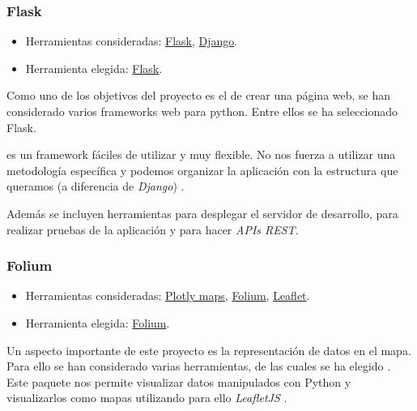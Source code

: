 \subsubsection{Flask}

\begin{itemize}
	\tightlist
	\item
	Herramientas consideradas:
	\href{http://flask.pocoo.org/}{Flask}, 
	\href{https://www.djangoproject.com/}{Django}.
	\item
	Herramienta elegida:
	\href{http://flask.pocoo.org/}{Flask}.
\end{itemize}

Como uno de los objetivos del proyecto es el de crear una página web, se han considerado varios frameworks web para python. Entre ellos se ha seleccionado Flask.

 es un framework fáciles de utilizar y muy flexible. No nos fuerza a utilizar una metodología específica y podemos organizar la aplicación con la estructura que queramos (a diferencia de \textit{Django}) \cite{book:flask}.

Además se incluyen herramientas para desplegar el servidor de desarrollo, para realizar pruebas de la aplicación y para hacer \textit{APIs REST}.

\subsubsection{Folium}

\begin{itemize}
	\tightlist
	\item
	Herramientas consideradas:
	\href{https://plot.ly/python/maps/}{Plotly maps}, 
	\href{http://python-visualization.github.io/folium/}{Folium},
	\href{https://leafletjs.com/}{Leaflet}.
	\item
	Herramienta elegida:
	\href{http://python-visualization.github.io/folium/}{Folium}.
\end{itemize}

Un aspecto importante de este proyecto es la representación de datos en el mapa. \\

Para ello se han considerado varias herramientas, de las cuales se ha elegido  \cite{docs:folium}. Este paquete nos permite visualizar datos manipulados con Python y visualizarlos como mapas utilizando para ello \textit{LeafletJS} \cite{docs:leaflet}.

